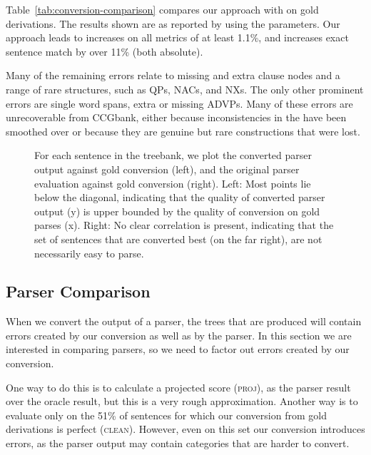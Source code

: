 Table~\ref{tab:conversion-comparison} compares our approach
with \old on gold \ccg derivations.  The results shown are 
as reported by \evalb
\parencite{Black-etal:1991} using the \textcite{Collins:1997} parameters.
Our approach leads to increases on all metrics of at least 1.1\%, and
increases exact sentence match by over 11\% (both absolute).

Many of the remaining errors relate to missing and extra clause nodes and a
range of rare structures, such as QPs, NACs, and NXs. The only other prominent
errors are single word spans, \myeg extra or missing ADVPs.  Many of these errors
are unrecoverable from CCGbank, either because inconsistencies in the \ptb have
been smoothed over or because they are genuine but rare constructions that
were lost.

\begin{figure}
	\hspace{-1.4cm}
	\scalebox{0.8}{
	
	\hspace{-2.9cm}
	
	}
	\caption{
		\label{fig:scatter_plots}
		For each sentence in the treebank, we plot the converted parser output
		against gold conversion (left), and the original parser evaluation against
		gold conversion (right).
		Left: Most points lie below the diagonal, indicating that the quality of
		converted parser output (y) is upper bounded by the quality of conversion on
		gold parses (x).
		Right: No clear correlation is present, indicating that the set of
		sentences that are converted best (on the far right), are not necessarily
		easy to parse.
	}
\end{figure}

\subsection{Parser Comparison}

When we convert the output of a \ccg parser, the \ptb trees that are produced
will contain errors created by our conversion as well as by the parser. In this
section we are interested in comparing parsers, so we need to factor out errors
created by our conversion.

One way to do this is to calculate a projected score (\textsc{proj}), as the
parser result over the oracle result, but this is a very rough approximation.
Another way is to evaluate only on the 51\% of sentences for which our
conversion from gold \ccg derivations is perfect (\textsc{clean}).  However,
even on this set our conversion introduces errors, as the parser output may
contain categories that are harder to convert.

